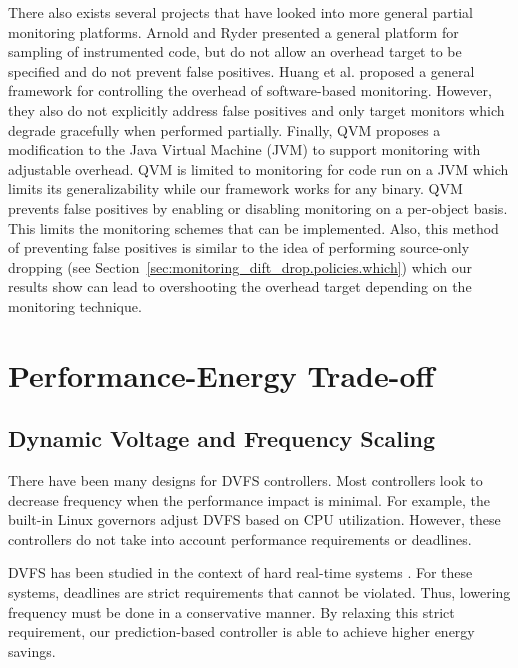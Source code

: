 There also exists several projects that have looked into more general partial
monitoring platforms. Arnold and Ryder \cite{arnold-pldi01} presented a general
platform for sampling of instrumented code, but do not allow an overhead target
to be specified and do not prevent false positives. Huang et al.
\cite{huang-sttt12} proposed a general framework for controlling the overhead
of software-based monitoring. However, they also do not explicitly address
false positives and only target monitors which degrade gracefully when
performed partially. Finally, QVM \cite{qvm-oopsla08} proposes a modification
to the Java Virtual Machine (JVM) to support monitoring with adjustable
overhead. QVM is limited to monitoring for code run on a JVM which limits its
generalizability while our framework works for any binary. QVM prevents false
positives by enabling or disabling monitoring on a per-object basis. This
limits the monitoring schemes that can be implemented. Also, this method of
preventing false positives is similar to the idea of performing source-only
dropping (see Section~\ref{sec:monitoring_dift_drop.policies.which}) which our
results show can lead to overshooting the overhead target depending on the
monitoring technique. 

\section{Performance-Energy Trade-off}
\label{sec:related_work.energy}

\subsection{Dynamic Voltage and Frequency Scaling}

There have been many designs for DVFS controllers. Most controllers look to
decrease frequency when the performance impact is minimal. For example, the
built-in Linux governors \cite{linux_governors} adjust DVFS based on CPU
utilization.  However, these controllers do not take into account performance
requirements or deadlines.

DVFS has been studied in the context of hard real-time systems
\cite{rtdvfs-systor12}. For these systems, deadlines are strict requirements
that cannot be violated. Thus, lowering frequency must be done in a
conservative manner.  By relaxing this strict requirement, our prediction-based
controller is able to achieve higher energy savings.

